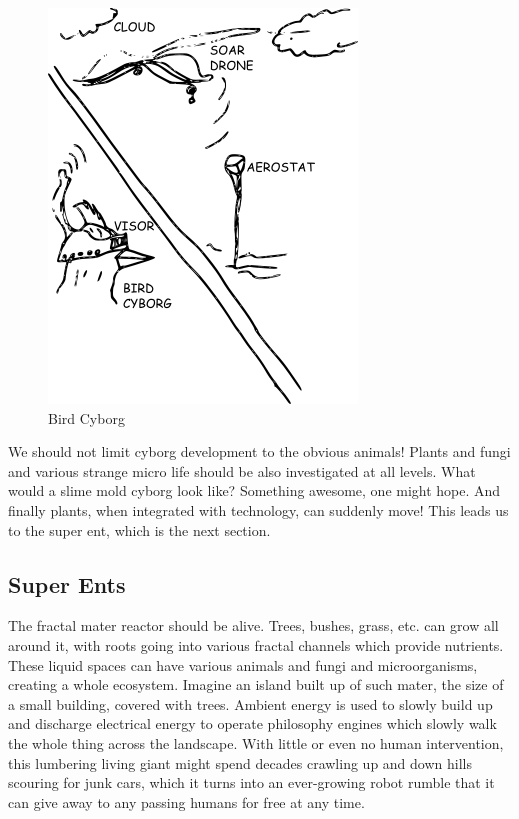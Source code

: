 \begin{figure}[htbp]
\centering
\includegraphics{images/birdcyborg.png}
\caption{Bird Cyborg}
\end{figure}

We should not limit cyborg development to the obvious animals! Plants
and fungi and various strange micro life should be also investigated at
all levels. What would a slime mold cyborg look like? Something awesome,
one might hope. And finally plants, when integrated with technology, can
suddenly move! This leads us to the super ent, which is the next
section.

\subsection{Super Ents}\label{super-ents}

The fractal mater reactor should be alive. Trees, bushes, grass, etc.
can grow all around it, with roots going into various fractal channels
which provide nutrients. These liquid spaces can have various animals
and fungi and microorganisms, creating a whole ecosystem. Imagine an
island built up of such mater, the size of a small building, covered
with trees. Ambient energy is used to slowly build up and discharge
electrical energy to operate philosophy engines which slowly walk the
whole thing across the landscape. With little or even no human
intervention, this lumbering living giant might spend decades crawling
up and down hills scouring for junk cars, which it turns into an
ever-growing robot rumble that it can give away to any passing humans
for free at any time.


